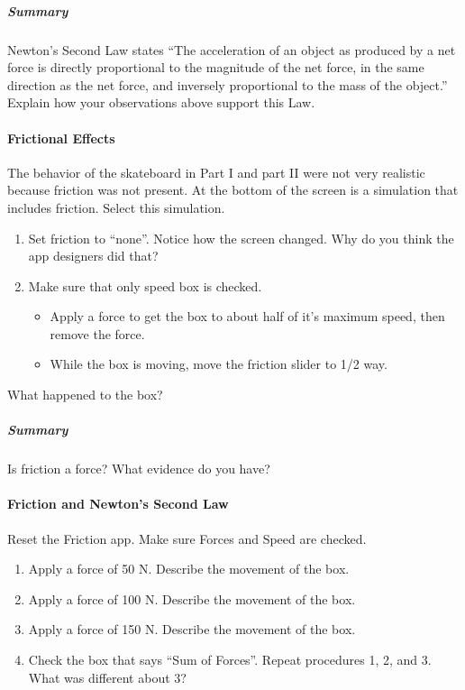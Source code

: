 \subparagraph{Summary}

Newton's Second Law states ``The acceleration of an object as produced by a net force is directly proportional to the magnitude of the net force, in the same direction as the net force, and inversely proportional to the mass of the object.'' Explain how your observations above support this Law.

\paragraph{Frictional Effects}

The behavior of the skateboard in Part I and part II were not very realistic because friction was not present. At the bottom of the screen is a simulation that includes friction. Select this simulation.

\begin{enumerate}
\item Set friction to ``none''. Notice how the screen changed. Why do you think the app designers did that?
\item Make sure that only speed box is checked.\begin{itemize}
\item Apply a force to get the box to about half of it's maximum speed, then remove the force.
\item While the box is moving, move the friction slider to 1/2 way.
\end{itemize}
\end{enumerate}

What happened to the box?

\subparagraph{Summary}

Is friction a force? What evidence do you have?

\paragraph{Friction and Newton's Second Law}

Reset the Friction app. Make sure Forces and Speed are checked.

\begin{enumerate}
\item Apply a force of 50 N. Describe the movement of the box.
\item Apply a force of 100 N. Describe the movement of the box.
\item Apply a force of 150 N. Describe the movement of the box.
\item Check the box that says ``Sum of Forces''. Repeat procedures 1, 2, and 3. What was different about 3?
\end{enumerate}

